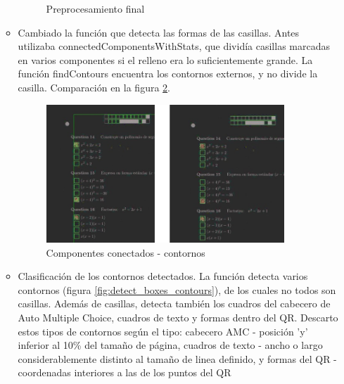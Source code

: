 \begin{itemize}
\begin{itemize}
\begin{figure}
            \caption{Preprocesamiento final}
            \label{fig:detect_boxes_ccws}
        \end{figure}
        \item Cambiado la función que detecta las formas de las casillas. Antes utilizaba connectedComponentsWithStats, que dividía casillas marcadas en varios componentes si el relleno era lo suficientemente grande. La función findContours encuentra los contornos externos, y no divide la casilla. Comparación en la figura \ref{fig:ccws_contours}.
        \begin{figure}
                \centering
                \includegraphics[width=0.9\textwidth]{figures/ccws_contours.png}
                \caption{Componentes conectados - contornos}
                \label{fig:ccws_contours}
        \end{figure}
        \item Clasificación de los contornos detectados. La función detecta varios contornos (figura \ref{fig:detect_boxes_contours}), de los cuales no todos son casillas. Además de casillas, detecta también los cuadros del cabecero de Auto Multiple Choice, cuadros de texto y formas dentro del QR. Descarto estos tipos de contornos según el tipo: cabecero AMC - posición 'y' inferior al 10\% del tamaño de página, cuadros de texto - ancho o largo considerablemente distinto al tamaño de linea definido, y formas del QR - coordenadas interiores a las de los puntos del QR
        \begin{figure}
                \centering

\end{figure}
\end{itemize}
\end{itemize}

